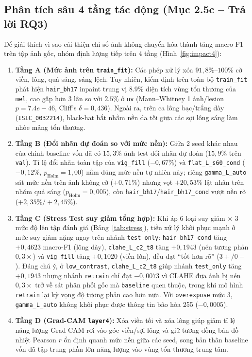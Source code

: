 \documentclass[10pt,twocolumn,a4paper]{article}
\begin{document}
\subsection{Phân tích sâu 4 tầng tác động (Mục 2.5c -- Trả lời RQ3)}
Để giải thích vì sao cải thiện chỉ số ảnh không chuyển hóa thành tăng macro-F1 trên tập ảnh gốc, nhóm định lượng tiếp trên 4 tầng (Hình~\ref{fig:impact4}):
\begin{enumerate}
    \item \textbf{Tầng A (Mức ảnh trên \texttt{train\_fit}):} Các phép xử lý xóa $91{,}8\%\text{--}100\%$ cờ viền, lông, quá sáng, sáng lệch. Tuy nhiên, kiểm định trên toàn bộ \texttt{train\_fit} phát hiện \texttt{hair\_bh17} inpaint trung vị $\mathbf{8.9\%}$ diện tích vùng tổn thương của \texttt{mel}, cao gấp hơn 3 lần so với $\mathbf{2.5\%}$ ở \texttt{nv} (Mann--Whitney 1 ảnh/lesion $p = 7.4e-46$, Cliff's $\delta = 0{,}436$). Ngoài ra, trên ca lông bạc/trắng dày (\texttt{ISIC\_0032214}), black-hat bắt nhầm nền da tối giữa các sợi lông sáng làm nhòe mảng tổn thương.
    \item \textbf{Tầng B (Đổi nhãn dự đoán so với mức nền):} Giữa 2 seed khác nhau của chính baseline vốn đã có $15{,}3\%$ ảnh test đổi nhãn dự đoán ($15{,}9\%$ trên \texttt{val}). Tỉ lệ đổi nhãn toàn tập của \texttt{vig\_fill} ($-0{,}67\%$) và \texttt{flat\_L\_s60\_cond} ($-0{,}12\%$, $p_{\text{Holm}}=1{,}00$) nằm đúng mức nền tự nhiên này; riêng \texttt{gamma\_L\_auto} sát mức nền trên ảnh không cờ ($+0{,}71\%$) nhưng vọt $+20{,}53\%$ lật nhãn trên nhóm quá sáng ($p_{\text{Holm}}=0{,}005$), còn \texttt{hair\_bh17}/\texttt{hair\_bh17\_cond} vượt nền rõ ($+2{,}35\%/+2{,}45\%$).
    \item \textbf{Tầng C (Stress Test suy giảm tổng hợp):} Khi áp 6 loại suy giảm $\times$ 3 mức độ lên tập đánh giá (Bảng~\ref{tab:stress}), tiền xử lý khôi phục mạnh ở mức suy giảm nặng ngay trên nhánh \texttt{test\_only}: \texttt{hair\_bh17\_cond} tăng $+0{,}4623$ macro-F1 (lông dày), \texttt{clahe\_L\_c2\_t8} tăng $+0{,}1943$ (nén tương phản $0{,}3\times$) và \texttt{vig\_fill} tăng $+0{,}1020$ (viền lớn), đều đạt ``tốt hơn rõ'' ($3+/0-$). Đáng chú ý, ở \texttt{low\_contrast}, \texttt{clahe\_L\_c2\_t8} giúp nhánh \texttt{test\_only} tăng $+0{,}1943$ nhưng nhánh \texttt{retrain} chỉ đạt $-0{,}0073$ vì CLAHE đưa ảnh bị nén $0{,}3\times$ trở về sát phân phối gốc mà \texttt{baseline} quen thuộc, trong khi mô hình \texttt{retrain} lại kỳ vọng độ tương phản cao hơn nữa. Với \texttt{overexpose} mức 3, \texttt{gamma\_L\_auto} không khôi phục được thông tin bão hòa 255 ($-0{,}0005$).
    \item \textbf{Tầng D (Grad-CAM \texttt{layer4}):} Xóa viền tối và xóa lông giúp giảm tỉ lệ năng lượng Grad-CAM rơi vào góc viền/sợi lông và giữ tương đồng bản đồ nhiệt Pearson $r$ ổn định quanh mức nền giữa các seed, song bản thân baseline vốn đã tập trung phần lớn năng lượng vào vùng tổn thương trung tâm.
\end{enumerate}
\end{document}
